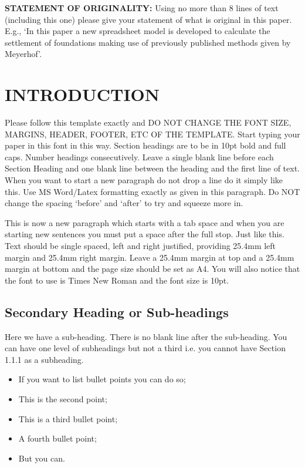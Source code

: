\documentclass[a4paper,10pt]{article}
\begin{document}
\noindent 
\textbf{STATEMENT OF ORIGINALITY:} Using no more than 8 lines of text (including this one) please give your statement of what is original in this paper. E.g., ‘In this paper a new spreadsheet model is developed to calculate the settlement of foundations making use of previously published methods given by Meyerhof’.


\section{INTRODUCTION}

Please follow this template exactly and DO NOT CHANGE THE FONT SIZE, MARGINS, HEADER, FOOTER, ETC OF THE TEMPLATE.  
Start typing your paper in this font in this way. Section headings are to be in 10pt bold and full caps. Number headings consecutively. Leave a single blank line before each Section Heading and one blank line between the heading and the first line of text. When you want to start a new paragraph do not drop a line do it simply like this. Use MS Word/Latex formatting exactly as given in this paragraph. Do NOT change the spacing ‘before’ and ‘after’ to try and squeeze more in.

This is now a new paragraph which starts with a tab space and when you are starting new sentences you must put a space after the full stop. Just like this. Text should be single spaced, left and right justified, providing 25.4mm left margin and 25.4mm right margin. Leave a 25.4mm margin at top and a 25.4mm margin at bottom and the page size should be set as A4. You will also notice that the font to use is Times New Roman and the font size is 10pt. 

\subsection{Secondary Heading or Sub-headings}

Here we have a sub-heading. There is no blank line after the sub-heading. You can have one level of subheadings but not a third i.e. you cannot have Section 1.1.1 as a subheading.

\begin{itemize}
    \item If you want to list bullet points you can do so;
    \item This is the second point;
    \item This is a third bullet point;
    \item A fourth bullet point;
    \item But you can.
\end{itemize}   
\end{document}
